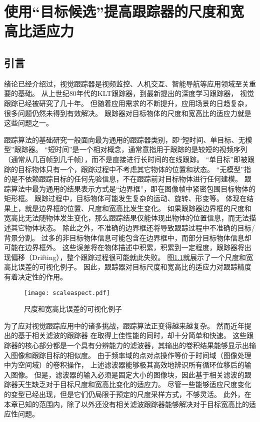 \chapter{使用``目标候选''提高跟踪器的尺度和宽高比适应力}
\label{chapbmvc}

\section{引言}
绪论已经介绍过，视觉跟踪器是视频监控、人机交互、智能导航等应用领域至关重要的基础。
从上世纪80年代的KLT跟踪器，到最新提出的深度学习跟踪器，
视觉跟踪已经被研究了几十年。
但随着应用需求的不断提升，应用场景的日趋复杂，很多问题仍然未得到有效解决。
跟踪器对目标物体的尺度和宽高比的适应力就是这些问题之一。

跟踪算法的基础研究一般面向最为通用的跟踪器类别，即``短时间、单目标、无模型''跟踪器。
``短时间''是一个相对概念，通常意指用于跟踪的是较短的视频序列（通常从几百帧到几千帧），而不是直接进行长时间的在线跟踪。
``单目标''即被跟踪的目标物体只有一个，跟踪过程中不考虑其它物体的位置和状态。
``无模型''指的是不依赖跟踪目标的任何先验信息，不在跟踪前对目标物体进行任何建模。
跟踪算法中最为通用的结果表示方式是``边界框''，即在图像帧中紧密包围目标物体的矩形框。
跟踪过程中，目标物体可能发生复杂的运动、旋转、形变等。
体现在结果上，就是边界框的位置、尺度和宽高比发生变化。
如果跟踪器边界框的尺度和宽高比无法随物体发生变化，那么跟踪结果仅能体现出物体的位置信息，而无法描述其它物体状态。
除此之外，不准确的边界框还将导致跟踪过程中不准确的目标/背景分割。
过多的非目标物体信息可能包含在边界框中，而部分目标物体信息却可能在边界框外。
这些误差将在物体描述中积累，积累到一定程度，跟踪器将出现偏移（Drifting），整个跟踪过程很可能就此失败。
图\ref{scalearerror}就展示了一个尺度和宽高比误差的可视化例子。
因此，跟踪器对目标尺度和宽高比的适应力对跟踪精度有着决定性的作用。

\begin{figure}[htb]
\centering
\texttt{[image: scaleaspect.pdf]}
\caption{尺度和宽高比误差的可视化例子}
\label{scalearerror}
\end{figure}

为了应对视觉跟踪应用中的诸多挑战，跟踪算法正变得越来越复杂。
然而近年提出的基于相关滤波的跟踪器 在取得上佳性能的同时，却十分简单和快速。
这些跟踪器的核心部分都是一个具有分辨能力的滤波器，其输出的卷积结果能够显示出输入图像和跟踪目标的相似度。
由于频率域的点对点操作等价于时间域（图像处理中为空间域）的卷积操作，
上述滤波器能够极其高效地辨识所有循环位移后的输入图像。
但是，滤波器的输入必须是固定大小的图像块，因此基于相关滤波的跟踪器天生缺乏对于目标尺度和宽高比变化的适应力。
尽管一些能够适应尺度变化的变型已经出现，但是它们仍局限于预定的尺度采样方式，不够灵活。
此外，在本章已知的范围内，除了\cite{pbcf}以外还没有相关滤波跟踪器能够解决对于目标宽高比的适应性问题。


